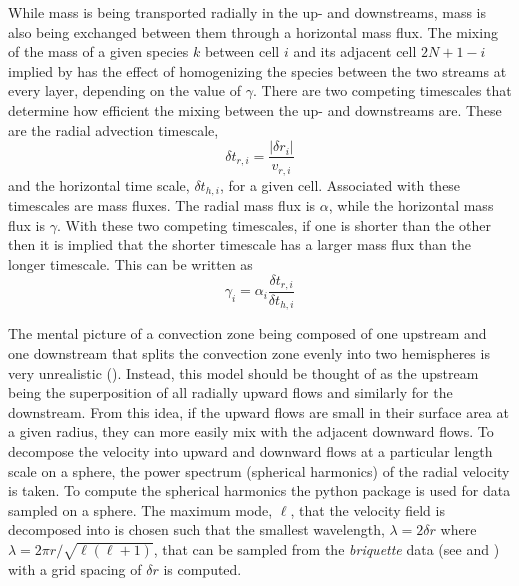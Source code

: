 \documentclass[fleqn,usenatbib]{mnras}
\begin{document}
While mass is being transported radially in the up- and downstreams, mass is
also being exchanged between them through a horizontal mass flux. The mixing of
the mass of a given species $k$ between cell $i$ and its adjacent cell $2N+1-i$
implied by  has the effect of homogenizing the species between the
two streams at every layer, depending on the value of $\gamma$. There are two
competing timescales that determine how efficient the mixing between the up- and
downstreams are. These are the radial advection timescale,
%
\begin{equation}
  \label{eq:radialT}
  \delta t_{r,i} = \frac{|\delta r_{i}|}{v_{r,i}}
\end{equation}
% 
and the horizontal time scale, $\delta t_{h,i}$, for a given cell. Associated
with these timescales are mass fluxes. The radial mass flux is $\alpha$, while
the horizontal mass flux is $\gamma$. With these two competing timescales, if
one is shorter than the other then it is implied that the shorter timescale has
a larger mass flux than the longer timescale. This can be written as
%
\begin{equation}
  \label{eq:timescales}
  \gamma_{i} = \alpha_{i} \frac{\delta t_{r,i}}{\delta t_{h,i}}
\end{equation}
%

The mental picture of a convection zone being composed of one upstream and one
downstream that splits the convection zone evenly into two hemispheres is very
unrealistic (). Instead, this model should be thought of as the
upstream being the superposition of all radially upward flows and similarly for
the downstream. From this idea, if the upward flows are small in their surface
area at a given radius, they can more easily mix with the adjacent downward
flows. To decompose the velocity into upward and downward flows at a particular
length scale on a sphere, the power spectrum (spherical harmonics) of the radial
velocity is taken. To compute the spherical harmonics the python package
 is used for data sampled on a sphere. The maximum mode, $\ell$,
that the velocity field is decomposed into is chosen such that the smallest
wavelength, $\lambda = 2 \delta r$ where $\lambda = 2 \pi r / \sqrt{\ell(\ell +
1)}$, that can be sampled from the \textit{briquette} data (see 
and
) with a grid spacing of $\delta r$ is computed.
\end{document}
